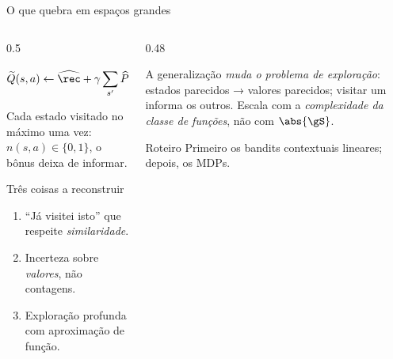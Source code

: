 \documentclass[aspectratio=169, 11pt]{beamer}
\newcommand{\Qtil}{\widetilde{Q}}
\newcommand{\Rhat}{\widehat{\rec}}
\newcommand{\That}{\widehat{P}}
\begin{document}
\begin{frame}{O que quebra em espaços grandes}
  \begin{columns}[T]
    \begin{column}{0.5\textwidth}
      \begin{alertabox}
        \vspace{-0.9em}
        \[
          \Qtil(s,a) \gets \Rhat + \gamma\sum_{s'}\That\max_{a'}\Qtil
          + \frac{\beta}{\sqrt{\mdestaque{rlVermelho}{n(s,a)}}}
        \]
        \vspace{-1.2em}

        Cada estado visitado no máximo uma vez: $n(s,a) \in \{0,1\}$, o bônus
        deixa de informar.
      \end{alertabox}
      \begin{defbox}{Três coisas a reconstruir}
        \begin{enumerate}\setlength{\itemsep}{0.1ex}
          \item ``Já visitei isto'' que respeite \emph{similaridade}.
          \item Incerteza sobre \emph{valores}, não contagens.
          \item Exploração profunda com aproximação de função.
        \end{enumerate}
      \end{defbox}
    \end{column}
    \begin{column}{0.48\textwidth}
      \begin{ideiabox}
        A generalização \emph{muda o problema de exploração}: estados parecidos →
        valores parecidos; visitar um informa os outros. Escala com a
        \emph{complexidade da classe de funções}, não com $\abs{\gS}$.
      \end{ideiabox}
      \begin{teobox}{Roteiro}
        Primeiro os bandits contextuais lineares; depois, os MDPs.
      \end{teobox}
    \end{column}
  \end{columns}
\end{frame}
\end{document}
